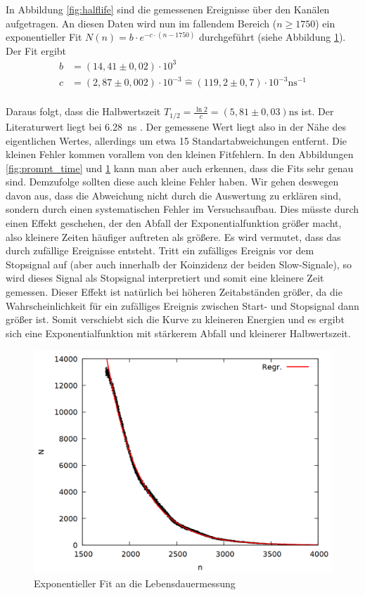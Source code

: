 In Abbildung \ref{fig:halflife} sind die gemessenen Ereignisse über den Kanälen aufgetragen. An diesen Daten wird nun im fallendem Bereich ($n \geq 1750$) ein exponentieller Fit $N(n)=b\cdot e^{-c\cdot (n-1750)}$ durchgeführt (siehe Abbildung \ref{fig:halflife2}). Der Fit ergibt
\begin{align*}
b &= (14,41 \pm 0,02) \cdot 10^3\\
c &= (2,87 \pm 0,002) \cdot 10^{-3} \mathrel{\widehat{=}} (119,2 \pm 0,7)\cdot 10^{-3} \si{\nano\second}^{-1}\\
\end{align*}

Daraus folgt, dass die Halbwertszeit $T_{1/2} = \frac{\ln{2}}{c} = (5,81 \pm 0,03) \si{\nano\second}$ ist. Der Literaturwert liegt bei \SI{6,28}{\nano\second} \cite{cs133}. Der gemessene Wert liegt also in der Nähe des eigentlichen Wertes, allerdings um etwa 15 Standartabweichungen entfernt. Die kleinen Fehler kommen vorallem von den kleinen Fitfehlern. In den Abbildungen \ref{fig:prompt_time} und \ref{fig:halflife2} kann man aber auch erkennen, dass die Fits sehr genau sind. Demzufolge sollten diese auch kleine Fehler haben. Wir gehen deswegen davon aus, dass die Abweichung nicht durch die Auswertung zu erklären sind, sondern durch einen systematischen Fehler im Versuchsaufbau. Dies müsste durch einen Effekt geschehen, der den Abfall der Exponentialfunktion größer macht, also kleinere Zeiten häufiger auftreten als größere. Es wird vermutet, dass das durch zufällige Ereignisse entsteht. Tritt ein zufälliges Ereignis vor dem Stopsignal auf (aber auch innerhalb der Koinzidenz der beiden Slow-Signale), so wird dieses Signal als Stopsignal interpretiert und somit eine kleinere Zeit gemessen. Dieser Effekt ist natürlich bei höheren Zeitabständen größer, da die Wahrscheinlichkeit für ein zufälliges Ereignis zwischen Start- und Stopsignal dann größer ist. Somit verschiebt sich die Kurve zu kleineren Energien und es ergibt sich eine Exponentialfunktion mit stärkerem Abfall und kleinerer Halbwertszeit. 

\begin{figure}[h]
\centering
\includegraphics[width=0.7\linewidth]{data/uebernacht2.png}
\caption{Exponentieller Fit an die Lebensdauermessung}
\label{fig:halflife2}
\end{figure}
